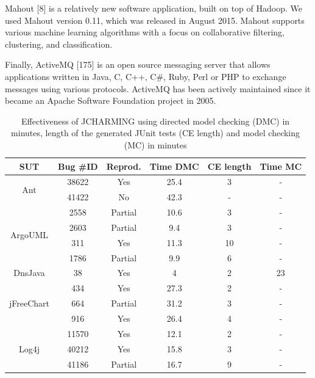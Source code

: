 \documentclass[12pt]{report}
\begin{document}
Mahout {[}8{]} is a relatively new software application, built on top of
Hadoop. We used Mahout version 0.11, which was released in August 2015.
Mahout supports various machine learning algorithms with a focus on
collaborative filtering, clustering, and classification.

Finally, ActiveMQ {[}175{]} is an open source messaging server that
allows applications written in Java, C, C++, C\#, Ruby, Perl or PHP to
exchange messages using various protocols. ActiveMQ has been actively
maintained since it became an Apache Software Foundation project in
2005.

\begin{table}[]
\centering
\caption{Effectiveness of JCHARMING using directed model checking (DMC) in minutes, length of the generated JUnit tests (CE length) and model checking (MC) in minutes}
\begin{tabular}{c|c|c|c|c|c}
SUT                         & Bug \#ID & Reprod. & Time DMC & CE length & Time MC \\ \hline \hline
\multirow{2}{*}{Ant}        & 38622    & Yes     & 25.4   & 3  & -       \\
                            & 41422    & No      & 42.3   & -  & -       \\ \hline
\multirow{4}{*}{ArgoUML}    & 2558     & Partial & 10.6   & 3  & -       \\
                            & 2603     & Partial & 9.4    & 3  & -       \\
                            & 311      & Yes     & 11.3   & 10  & -       \\
                            & 1786     & Partial & 9.9    & 6  & -       \\  \hline
DnsJava                     & 38       & Yes     & 4      & 2  & 23      \\ \hline
\multirow{3}{*}{jFreeChart} & 434      & Yes     & 27.3   & 2  & -       \\
                            & 664      & Partial & 31.2   & 3   & -       \\
                            & 916      & Yes     & 26.4   & 4  & -       \\ \hline
\multirow{7}{*}{Log4j}      & 11570    & Yes     & 12.1   & 2  & -       \\
                            & 40212    & Yes     & 15.8   & 3  & -       \\
                            & 41186    & Partial & 16.7   & 9  & -       \\

\end{tabular}
\end{table}
\end{document}
